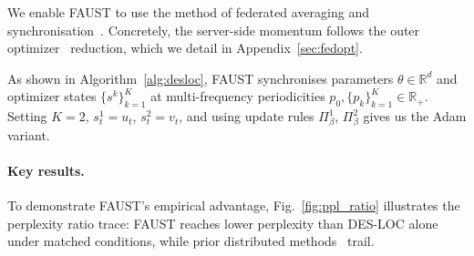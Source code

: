 \documentclass{article}
\begin{document}
We enable FAUST to use the method of federated averaging and
synchronisation~\citep{mcmahan2017communication}. Concretely, the server-side momentum follows the outer optimizer~\citep{reddi2021adaptivefederatedoptimization} reduction, which we detail in Appendix~\ref{sec:fedopt}.

As shown in Algorithm~\ref{alg:desloc}, FAUST synchronises
parameters $\theta \in \mathbb{R}^d$ and optimizer states $\{s^k\}_{k=1}^K$ at multi-frequency periodicities $p_0, \{p_k\}_{k=1}^K \in \mathbb{R}_+$.
Setting $K = 2$, $s^1_t = u_t$, $s^2_t = v_t$, and using update rules $\Pi_{\!\beta}^1$, $\Pi_{\!\beta}^2$ gives us the Adam
variant.

\paragraph{Key results.} To demonstrate FAUST's empirical advantage, Fig.~\ref{fig:ppl_ratio} illustrates the perplexity ratio trace: FAUST
 reaches lower perplexity than DES-LOC alone under matched conditions, while prior distributed methods~\citep{douillard2024dilocodistributedlowcommunicationtraining,sani2024photonfederatedllmpretraining,zhang2024deptdecoupledprompttuning,sani2024futurelargelanguagemodel} trail.
\end{document}
